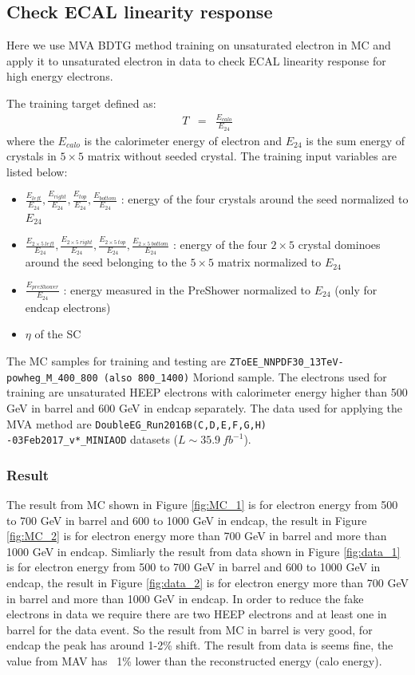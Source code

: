 \subsection{Check ECAL linearity response}
\label{linearity}

Here we use MVA BDTG method training on unsaturated electron in MC and apply it to
unsaturated electron in data to check ECAL linearity response for high energy electrons.

The training target defined as:
\begin{eqnarray}
  T & = & \frac{E_{calo}}{E_{24}} \label{equ:ECAL_linearity_target}
\end{eqnarray}
where the $E_{calo}$ is the calorimeter energy of electron and $E_{24}$ is the sum energy of crystals in $5\times5$ matrix without seeded crystal.
The training input variables are listed below:
\begin{itemize}
\item $\frac{E_{left}}{E_{24}}, \frac{E_{right}}{E_{24}}, \frac{E_{top}}{E_{24}}, \frac{E_{bottom}}{E_{24}}$ : energy of the four crystals around the seed normalized to $E_{24}$
\item $\frac{E_{2\times5~ left}}{E_{24}}, \frac{E_{2\times5~ right}}{E_{24}}, \frac{E_{2\times5~top}}{E_{24}}, \frac{E_{2\times5~ bottom}}{E_{24}}$ : energy of the four $2\times5$ crystal dominoes around the seed belonging to the $5\times5$ matrix normalized to $E_{24}$
\item $\frac{E_{preShower}}{E_{24}}$ : energy measured in the PreShower normalized to $E_{24}$ (only for endcap electrons)
\item $\eta$ of the SC
\end{itemize}

The MC samples for training and testing are \texttt{ZToEE\_NNPDF30\_13TeV-powheg\_M\_400\_800 (also 800\_1400)} Moriond sample. The electrons used for training are unsaturated HEEP electrons with calorimeter energy higher than 500 GeV in barrel and 600 GeV in endcap separately. The data used for applying the MVA method are \texttt{DoubleEG\_Run2016B(C,D,E,F,G,H)\\-03Feb2017\_v*\_MINIAOD} datasets ($L \sim 35.9~fb^{-1} $).

\subsubsection{Result}
The result from MC shown in Figure \ref{fig:MC_1} is for electron energy from 500 to 700 GeV in barrel and 600 to 1000 GeV in endcap, the result in Figure \ref{fig:MC_2} is for electron energy more than 700 GeV in barrel and more than 1000 GeV in endcap. Simliarly the result from data shown in Figure \ref{fig:data_1} is for electron energy from 500 to 700 GeV in barrel and 600 to 1000 GeV in endcap, the result in Figure \ref{fig:data_2} is for electron energy more than 700 GeV in barrel and more than 1000 GeV in endcap. In order to reduce the fake electrons in data we require there are two HEEP electrons and at least one in barrel for the data event. So the result from MC in barrel is very good, for endcap the peak has around 1-2\% shift. The result from data is seems fine, the value from MAV has ~1\% lower than the reconstructed energy (calo energy).

